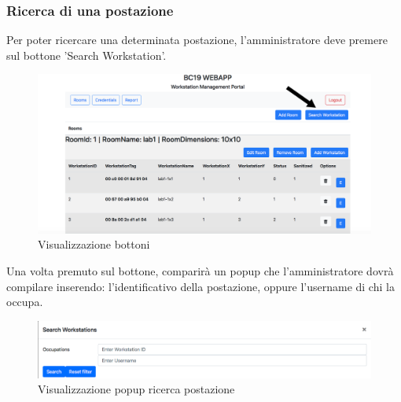 \subsubsection{Ricerca di una postazione}
Per poter ricercare una determinata postazione, l'amministratore deve premere sul bottone 'Search Workstation'.
\begin{figure}[H]
	\centering
	\includegraphics[width=15cm]{res/images/bottoneSearchWorkstation.png}
	\caption{Visualizzazione bottoni}
\end{figure}
Una volta premuto sul bottone, comparirà un popup che l'amministratore dovrà compilare inserendo:
l'identificativo della postazione, oppure l'username di chi la occupa.
\begin{figure}[H]
	\centering
	\includegraphics[width=15cm]{res/images/ricercaPostazione.png}
	\caption{Visualizzazione popup ricerca postazione}
\end{figure}

